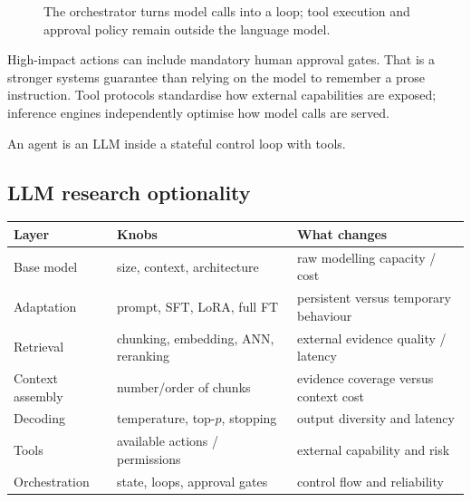 \begin{figure}[htbp]
\centering
{}
\caption{The orchestrator turns model calls into a loop; tool execution and approval policy remain outside the language model.}
\end{figure}

High-impact actions can include mandatory human approval gates.
That is a stronger systems guarantee than relying on the model to remember a prose instruction.
Tool protocols standardise how external capabilities are exposed; inference engines independently optimise how model calls are served.

\begin{calloutmemoryhook}
An agent is an LLM inside a stateful control loop with tools.
\end{calloutmemoryhook}

\subsection{LLM research optionality}
\label{sec:llms-optionality}
\begin{center}
\small
\begin{tabularx}{.96\linewidth}{@{}L{.22\linewidth}YY@{}}
\toprule
\textbf{Layer} & \textbf{Knobs} & \textbf{What changes} \\
\midrule
Base model & size, context, architecture & raw modelling capacity / cost \\
Adaptation & prompt, SFT, LoRA, full FT & persistent versus temporary behaviour \\
Retrieval & chunking, embedding, ANN, reranking & external evidence quality / latency \\
Context assembly & number/order of chunks & evidence coverage versus context cost \\
Decoding & temperature, top-$p$, stopping & output diversity and latency \\
Tools & available actions / permissions & external capability and risk \\
Orchestration & state, loops, approval gates & control flow and reliability \\
\bottomrule
\end{tabularx}
\end{center}


